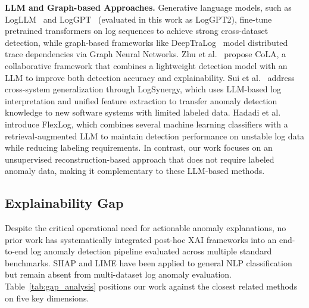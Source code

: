 \documentclass{elektr}
\begin{document}
\textbf{LLM and Graph-based Approaches.}
Generative language models, such as LogLLM~\cite{ref23} and LogGPT~\cite{ref24} (evaluated in this work as LogGPT2), fine-tune pretrained transformers on log sequences to achieve strong cross-dataset detection, while graph-based frameworks like DeepTraLog~\cite{ref22} model distributed trace dependencies via Graph Neural Networks. Zhu et al.~\cite{ref25} propose CoLA, a collaborative framework that combines a lightweight detection model with an LLM to improve both detection accuracy and explainability. Sui et al.~\cite{ref26} address cross-system generalization through LogSynergy, which uses LLM-based log interpretation and unified feature extraction to transfer anomaly detection knowledge to new software systems with limited labeled data. Hadadi et al.~\cite{ref27} introduce FlexLog, which combines several machine learning classifiers with a retrieval-augmented LLM to maintain detection performance on unstable log data while reducing labeling requirements. In contrast, our work focuses on an unsupervised reconstruction-based approach that does not require labeled anomaly data, making it complementary to these LLM-based methods.

\subsection{Explainability Gap}

Despite the critical operational need for actionable anomaly explanations, no prior
work has systematically integrated post-hoc XAI frameworks into an end-to-end log
anomaly detection pipeline evaluated across multiple standard benchmarks. SHAP and
LIME have been applied to general NLP classification but remain absent from
multi-dataset log anomaly evaluation. Table~\ref{tab:gap_analysis} positions our
work against the closest related methods on five key dimensions.
\end{document}
